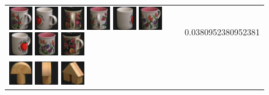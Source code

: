 \begin{figure}[!p]
\begin{center}
\begin{tabular}{m{11cm} | m{3cm} |}
\includegraphics[width=1cm]{coil/beeld-10.eps}
\includegraphics[width=1cm]{coil/beeld-40.eps}
\includegraphics[width=1cm]{coil/beeld-65.eps}
\includegraphics[width=1cm]{coil/beeld-11.eps}
\includegraphics[width=1cm]{coil/beeld-38.eps}
\includegraphics[width=1cm]{coil/beeld-9.eps}
\includegraphics[width=1cm]{coil/beeld-39.eps}
\includegraphics[width=1cm]{coil/beeld-8.eps}
\includegraphics[width=1cm]{coil/beeld-64.eps}
& {\scriptsize 0.0380952380952381}
\\
\includegraphics[width=1cm]{coil/beeld-0.eps}
\includegraphics[width=1cm]{coil/beeld-2.eps}
\includegraphics[width=1cm]{coil/beeld-46.eps}

\end{tabular}
\end{center}
\end{figure}
